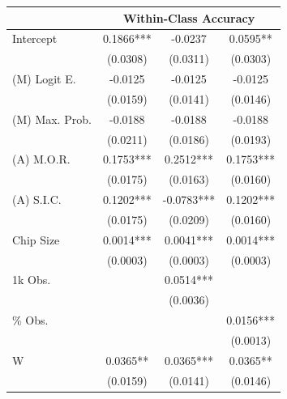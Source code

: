 \begin{table}
\begin{tabular}{lccc}
\toprule
{}  &       \multicolumn{3}{c}{Within-Class Accuracy} \\
\midrule
Intercept                                         &   0.1866*** &     -0.0237 &    0.0595** \\
                                                  &    (0.0308) &    (0.0311) &    (0.0303) \\
(M) Logit E.                                      &     -0.0125 &     -0.0125 &     -0.0125 \\
                                                  &    (0.0159) &    (0.0141) &    (0.0146) \\
(M) Max. Prob.                                    &     -0.0188 &     -0.0188 &     -0.0188 \\
                                                  &    (0.0211) &    (0.0186) &    (0.0193) \\
(A) M.O.R.                                        &   0.1753*** &   0.2512*** &   0.1753*** \\
                                                  &    (0.0175) &    (0.0163) &    (0.0160) \\
(A) S.I.C.                                        &   0.1202*** &  -0.0783*** &   0.1202*** \\
                                                  &    (0.0175) &    (0.0209) &    (0.0160) \\
Chip Size                                         &   0.0014*** &   0.0041*** &   0.0014*** \\
                                                  &    (0.0003) &    (0.0003) &    (0.0003) \\
1k Obs.                                           &             &   0.0514*** &             \\
                                                  &             &    (0.0036) &             \\
\% Obs.                                           &             &             &   0.0156*** \\
                                                  &             &             &    (0.0013) \\
W                                                 &    0.0365** &   0.0365*** &    0.0365** \\
                                                  &    (0.0159) &    (0.0141) &    (0.0146) \\

\end{tabular}
\end{table}
